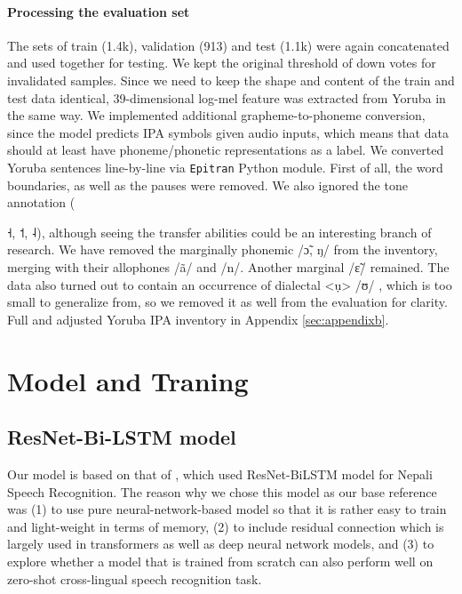 \documentclass[11pt]{article}
\newcommand{\ipa}[1]{{\ipafont #1}}
\begin{document}
\paragraph{Processing the evaluation set} The sets of train (1.4k), validation (913) and test (1.1k) were again concatenated and used together for testing. We kept the original threshold of down votes for invalidated samples. Since we need to keep the shape and content of the train and test data identical, 39-dimensional log-mel feature was extracted from Yoruba in the same way.
We implemented additional grapheme-to-phoneme conversion, since the model predicts IPA symbols given audio inputs, which means that data should at least have phoneme/phonetic representations as a label. We converted Yoruba sentences line-by-line via \texttt{Epitran} Python module. First of all, the word boundaries, as well as the pauses were removed. We also ignored the tone annotation ({\ipa{˧}, \ipa{˦}, \ipa{˨}), although seeing the transfer abilities could be an interesting branch of research. We have removed the marginally phonemic \ipa{/ɔ̃}, \ipa{ŋ/} from the inventory, merging with their allophones \ipa{/ã/} and \ipa{/n/}. \cite{Przezdziecki2005} Another marginal \ipa{/ɛ̃/} remained. The data also turned out to contain an occurrence of dialectal \ipa{<ụ> /ʊ/} \citet{AllenPulleyblankAjiboye2013}, which is too small to generalize from, so we removed it as well from the evaluation for clarity. Full and adjusted Yoruba IPA inventory in Appendix \ref{sec:appendixb}.

\section{Model and Traning}
\subsection{ResNet-Bi-LSTM model}
Our model is based on that of \cite{dhakal2022automatic}, which used ResNet-BiLSTM model for Nepali Speech Recognition. The reason why we chose this model as our base reference was (1) to use pure neural-network-based model so that it is rather easy to train and light-weight in terms of memory, (2) to include residual connection which is largely used in transformers as well as deep neural network models, and (3) to explore whether a model that is trained from scratch can also perform well on zero-shot cross-lingual speech recognition task.

}
\end{document}
